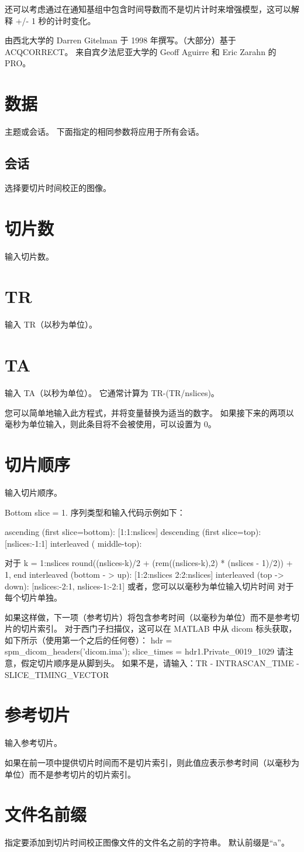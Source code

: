 还可以考虑通过在通知基组中包含时间导数而不是切片计时来增强模型，这可以解释 +/- 1 秒的计时变化。


由西北大学的 Darren Gitelman 于 1998 年撰写。（大部分）基于 ACQCORRECT。
来自宾夕法尼亚大学的 Geoff Aguirre 和 Eric Zarahn 的 PRO。


\section{数据}
主题或会话。
下面指定的相同参数将应用于所有会话。


\subsection{会话}
选择要切片时间校正的图像。


\section{切片数}
输入切片数。


\section{TR}
输入 TR（以秒为单位）。


\section{TA}

输入 TA（以秒为单位）。
它通常计算为 TR-(TR/nslices)。


您可以简单地输入此方程式，并将变量替换为适当的数字。
如果接下来的两项以毫秒为单位输入，则此条目将不会被使用，可以设置为 0。


\section{切片顺序}
输入切片顺序。

Bottom slice = 1. 序列类型和输入代码示例如下： 

ascending (first slice=bottom): [1:1:nslices] descending (first slice=top): [nslices:-1:1] interleaved ( middle-top): 

对于 k = 1:nslices round((nslices-k)/2 + (rem((nslices-k),2) * (nslices - 1)/2)) + 1, end interleaved (bottom - > up): [1:2:nslices 2:2:nslices] interleaved (top -> down): [nslices:-2:1, nslices-1:-2:1] 或者，您可以以毫秒为单位输入切片时间 对于每个切片单独。


如果这样做，下一项（参考切片）将包含参考时间（以毫秒为单位）而不是参考切片的切片索引。 对于西门子扫描仪，这可以在 MATLAB 中从 dicom 标头获取，如下所示（使用第一个之后的任何卷）： hdr = spm_dicom_headers('dicom.ima'); slice_times = hdr1.Private_0019_1029 请注意，假定切片顺序是从脚到头。 如果不是，请输入：TR - INTRASCAN_TIME - SLICE_TIMING_VECTOR


\section{参考切片}

输入参考切片。

如果在前一项中提供切片时间而不是切片索引，则此值应表示参考时间（以毫秒为单位）而不是参考切片的切片索引。

\section{文件名前缀}

指定要添加到切片时间校正图像文件的文件名之前的字符串。 默认前缀是“a”。
